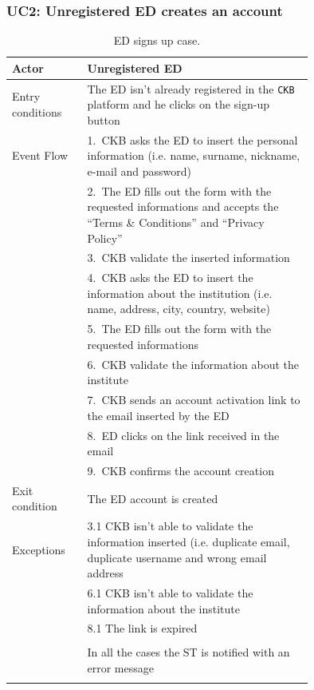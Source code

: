 \subsubsection*{UC2: Unregistered ED creates an account}
\begin{center}
  \begin{longtable}{l|p{0.75\linewidth}}
    \hline
    Actor & Unregistered ED \\
    \hline
    Entry conditions & The ED isn’t already registered in the \verb|CKB| platform and he clicks on the sign-up button \\
    \hline
    Event Flow & 1.\ CKB asks the ED to insert the personal information (i.e. name, surname, nickname, e-mail and password) \\
    & 2.\ The ED fills out the form with the requested informations and accepts the “Terms \& Conditions” and “Privacy Policy” \\
    & 3.\ CKB validate the inserted information \\
    & 4.\ CKB asks the ED to insert the information about the institution (i.e. name, address, city, country, website) \\
    & 5.\ The ED fills out the form with the requested informations \\
    & 6.\ CKB validate the information about the institute \\
    & 7.\ CKB sends an account activation link to the email inserted by the ED \\
    & 8.\ ED clicks on the link received in the email \\
    & 9.\ CKB confirms the account creation  \\
    \hline
    Exit condition & The ED account is created \\
    \hline
    Exceptions & 3.1 CKB isn’t able to validate the information inserted (i.e. duplicate email, duplicate username and wrong email address \\
    & 6.1 CKB isn’t able to validate the information about the institute \\
    & 8.1 The link is expired \\ \\
    & In all the cases the ST is notified with an error message\\
    \hline
    \caption{ED signs up case.}
    \label{tab: ED_signs_up}
  \end{longtable}


\end{center}
